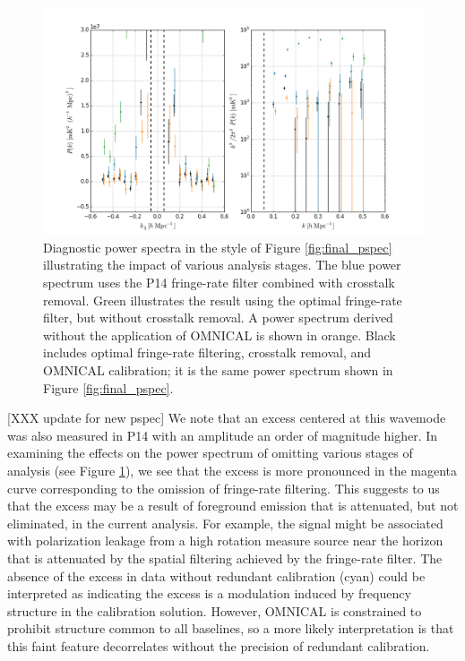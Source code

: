 \documentclass[twocolumn,numberedappendix]{emulateapj} \shorttitle{New Limits on the 21 cm Power Spectrum at $z=8.4$}
\begin{document}
\begin{figure}\centering
\includegraphics[width=2\columnwidth]{plots/pspec_comparison.png}
\caption{
Diagnostic power spectra in the style of Figure \ref{fig:final_pspec}
illustrating the impact of various analysis stages.
The blue power spectrum uses the P14 fringe-rate filter combined with crosstalk removal.
Green illustrates the result using the optimal fringe-rate filter, but without crosstalk removal.
A power spectrum derived without the application of OMNICAL is shown in orange.  Black
includes optimal fringe-rate filtering, crosstalk removal, and OMNICAL calibration; it is the 
same power spectrum shown in Figure \ref{fig:final_pspec}.
}\label{fig:pspec_comp}
\end{figure}


[XXX update for new pspec]
We note that an excess centered at this wavemode was also
measured in P14 with an amplitude an order of magnitude higher.
In examining the effects on the power
spectrum of omitting various stages of analysis (see Figure \ref{fig:pspec_comp}), we
see that the excess is more pronounced in the magenta curve corresponding 
to the omission of fringe-rate filtering.
This suggests to us that the excess may be a result of foreground emission that is attenuated,
but not eliminated, in the current analysis.  
For example, the signal might be associated with
polarization leakage from a high rotation measure source near the horizon that
is attenuated by the spatial filtering achieved by the fringe-rate filter.
The absence of the excess in data without redundant calibration
(cyan) could be interpreted as indicating the excess is a modulation induced by frequency structure
in the calibration solution.  However, OMNICAL is constrained
to prohibit structure common to all baselines, so a more likely interpretation is that 
this faint feature decorrelates without the precision of redundant calibration.
\end{document}
